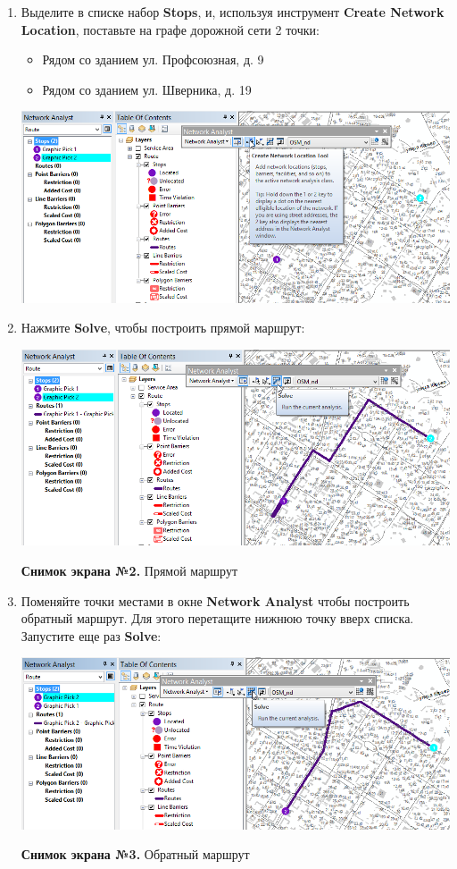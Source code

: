 \documentclass[12pt,]{book}
\providecommand{\tightlist}{%
  \setlength{\itemsep}{0pt}\setlength{\parskip}{0pt}}
\begin{document}
\begin{enumerate}
\def\labelenumi{\arabic{enumi}.}
\item
  Выделите в списке набор \textbf{Stops}, и, используя инструмент \textbf{Create Network Location}, поставьте на графе дорожной сети 2 точки:

  \begin{itemize}
  \tightlist
  \item
    Рядом со зданием ул. Профсоюзная, д. 9
  \item
    Рядом со зданием ул. Шверника, д. 19
  \end{itemize}

  \includegraphics{images/Ex12/image10.png}
\item
  Нажмите \textbf{Solve}, чтобы построить прямой маршрут:

  \includegraphics{images/Ex12/image11.png}

  \textbf{Снимок экрана №2.} Прямой маршрут
\item
  Поменяйте точки местами в окне \textbf{Network Analyst} чтобы построить обратный маршрут. Для этого перетащите нижнюю точку вверх списка. Запустите еще раз \textbf{Solve}:

  \includegraphics{images/Ex12/image12.png}

  \textbf{Снимок экрана №3.} Обратный маршрут
\end{enumerate}
\end{document}
